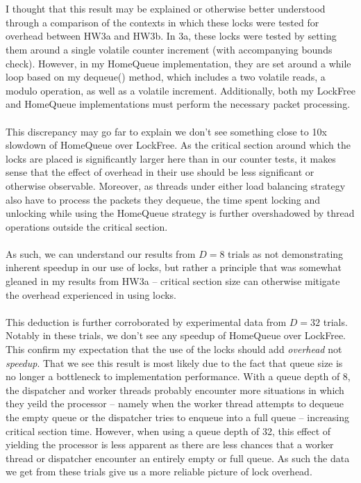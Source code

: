\documentclass[]{article}
\begin{document}
\\\\
I thought that this result may be explained or otherwise better understood through a comparison of the contexts in which these locks were tested for overhead between HW3a and HW3b. In 3a, these locks were tested by setting them around a single volatile counter increment (with accompanying bounds check). However, in my HomeQueue implementation, they are set around a while loop based on my dequeue() method, which includes a two volatile reads, a modulo operation, as well as a volatile increment. Additionally, both my LockFree and HomeQueue implementations must perform the necessary packet processing.
\\\\
This discrepancy may go far to explain we don't see something close to 10x slowdown of HomeQueue over LockFree. As the critical section around which the locks are placed is significantly larger here than in our counter tests, it makes sense that the effect of overhead in their use should be less significant or otherwise observable. Moreover, as threads under either load balancing strategy also have to process the packets they dequeue, the time spent locking and unlocking while using the HomeQueue strategy is further overshadowed by thread operations outside the critical section. 
\\\\
As such, we can understand our results from $D = 8$ trials as not demonstrating inherent speedup in our use of locks, but rather a principle that was somewhat gleaned in my results from HW3a -- critical section size can otherwise mitigate the overhead experienced in using locks.
\\\\
This deduction is further corroborated by experimental data from $D = 32$ trials. Notably in these trials, we don't see any speedup of HomeQueue over LockFree. This confirm my expectation that the use of the locks should add \textit{overhead} not \textit{speedup}. That we see this result is most likely due to the fact that queue size is no longer a bottleneck to implementation performance. With a queue depth of 8, the dispatcher and worker threads probably encounter more situations in which they yeild the processor -- namely when the worker thread attempts to dequeue the empty queue or the dispatcher tries to enqueue into a full queue -- increasing critical section time. However, when using a queue depth of 32, this effect of yielding the processor is less apparent as there are less chances that a worker thread or dispatcher encounter an entirely empty or full queue. As such the data we get from these trials give us a more reliable picture of lock overhead.
\end{document}
